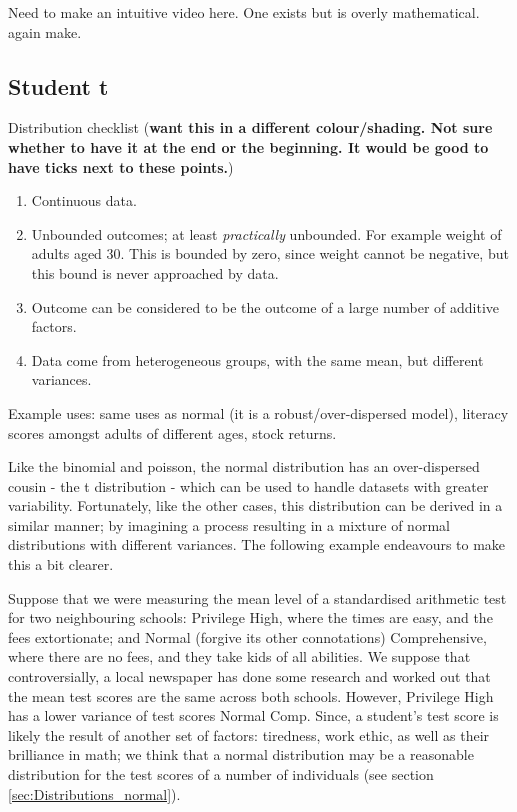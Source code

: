 \documentclass[11pt,fullpage]{book}
\begin{document}
 Need to make an intuitive video here. One exists but is overly mathematical.
 again make.

\subsection{Student t}\label{sec:Distributions_tDist}
Distribution checklist (\textbf{want this in a different colour/shading. Not sure whether to have it at the end or the beginning. It would be good to have ticks next to these points.})

\begin{enumerate} 
\item Continuous data.
\item Unbounded outcomes; at least \textit{practically} unbounded. For example weight of adults aged 30. This is bounded by zero, since weight cannot be negative, but this bound is never approached by data.
\item Outcome can be considered to be the outcome of a large number of additive factors.
\item Data come from heterogeneous groups, with the same mean, but different variances.
\end{enumerate}


Example uses: same uses as normal (it is a robust/over-dispersed model), literacy scores amongst adults of different ages, stock returns.

Like the binomial and poisson, the normal distribution has an over-dispersed cousin - the t distribution - which can be used to handle datasets with greater variability. Fortunately, like the other cases, this distribution can be derived in a similar manner; by imagining a process resulting in a mixture of normal distributions with different variances. The following example endeavours to make this a bit clearer.

Suppose that we were measuring the mean level of a standardised arithmetic test for two neighbouring schools: Privilege High, where the times are easy, and the fees extortionate; and Normal (forgive its other connotations) Comprehensive, where there are no fees, and they take kids of all abilities. We suppose that controversially, a local newspaper has done some research and worked out that the mean test scores are the same across both schools. However, Privilege High has a lower variance of test scores Normal Comp. Since, a student's test score is likely the result of another set of factors: tiredness, work ethic, as well as their brilliance in math; we think that a normal distribution may be a reasonable distribution for the test scores of a number of individuals (see section \ref{sec:Distributions_normal}). 
\end{document}
